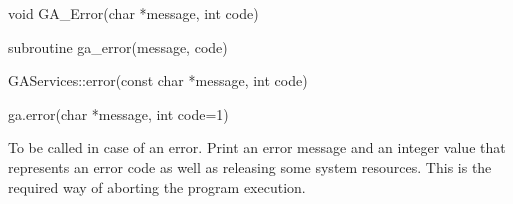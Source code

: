 \documentclass[12pt]{article}
\begin{document}


\begin{capi}
\begin{ccode}
void GA_Error(char *message, int code)
\end{ccode}
\begin{funcargs}
\end{funcargs}
\end{capi}

\begin{fapi}
\begin{fcode}
subroutine ga_error(message, code)
\end{fcode}
\begin{funcargs}
\end{funcargs}
\end{fapi}

\begin{cxxapi}
\begin{cxxcode}
GAServices::error(const char *message, int code)
\end{cxxcode}
\begin{funcargs}
\end{funcargs}
\end{cxxapi}

\begin{pyapi}
\begin{pycode}
ga.error(char *message, int code=1)
\end{pycode}
\begin{funcargs}
\end{funcargs}
\end{pyapi}

\local

\begin{desc}

To be called in case of an error. Print an error message and an integer value
that represents an error code as well as releasing some system resources. This is the
required way of aborting the program execution.

\end{desc}

\end{document}
